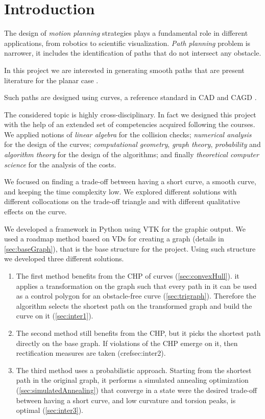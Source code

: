 \documentclass[dissertation.tex]{subfiles}
\begin{document}
\chapter{Introduction}
The design of \emph{motion planning} strategies plays a fundamental
role in different applications, from robotics to scientific
visualization. \emph{Path planning} problem is
narrower, it includes the identification of paths that do not
intersect any obstacle.

In this project we are interested in generating smooth paths that are
present literature for the planar case \cite{giannelli}.


 Such paths are designed using
\bs curves, a reference standard in \ac{CAD} and \ac{CAGD}
\cite{hughes}\cite{foley}\cite{farin}\cite{farin2}.

The considered topic is highly cross-disciplinary. In fact we designed
this project with the help of an extended set of
competencies acquired following the courses. We applied notions of
\emph{linear algebra} for the collision checks; \emph{numerical
  analysis} for the design of the curves; \emph{computational
  geometry},
\emph{graph theory}, \emph{probability} and \emph{algorithm theory}
for the design of the 
algorithms; and finally \emph{theoretical computer science} for the
analysis of the costs.

We focused on finding a trade-off between having a short curve, a
smooth curve, and keeping the time complexity low. We explored
different solutions with different collocations on the trade-off
triangle and with different qualitative effects on the curve.

We developed a framework in Python using \ac{VTK} for the graphic
output. We used a roadmap method based on \acp{VD} for creating a
graph (details in
\cref{sec:baseGraph}), that is the base
structure for the project. Using such structure we developed three
different solutions.
\begin{enumerate}
\item The first method benefits from the \acf{CHP} of \bs
  curves (\cref{sec:convexHull}). it applies a transformation on the
  graph such that every path in it can be used as a control polygon
  for an obstacle-free curve (\cref{sec:trigraph}). Therefore the
  algorithm selects the shortest path on the transformed graph and
  build the curve on it (\cref{sec:inter1}).
\item The second method still benefits from the \ac{CHP},
  but it picks the shortest path directly on the base graph. If
  violations of the \ac{CHP} emerge on it, then rectification
  measures are taken (cref{sec:inter2}).
\item The third method uses a probabilistic approach. Starting from
  the shortest path in the original graph, it performs a simulated
  annealing optimization (\cref{sec:simulatedAnnealing}) that converge
  in a state were the desired trade-off between having a short curve,
  and low curvature
  and torsion peaks, is optimal (\cref{sec:inter3}).
\end{enumerate}
\end{document}
